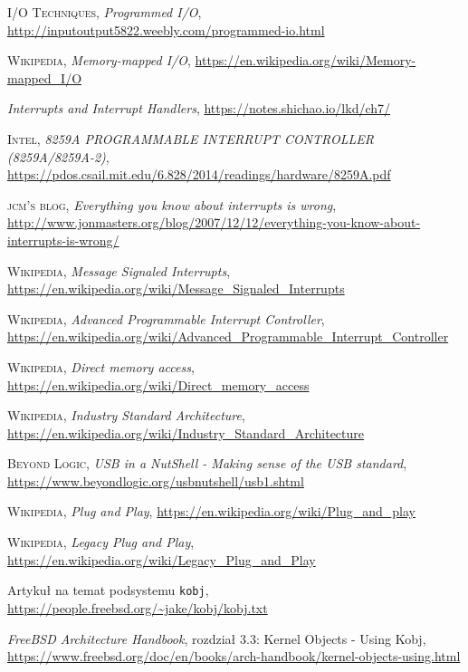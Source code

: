 \documentclass[shortabstract,inz]{iithesis}
\begin{document}
\begin{thebibliography}{1}
 \textsc{I/O Techniques}, \textit{Programmed I/O},
\url{http://inputoutput5822.weebly.com/programmed-io.html}

 \textsc{Wikipedia}, \textit{Memory-mapped I/O},
\url{https://en.wikipedia.org/wiki/Memory-mapped_I/O}

 \textit{Interrupts and Interrupt Handlers},
\url{https://notes.shichao.io/lkd/ch7/}

 \textsc{Intel}, \textit{8259A PROGRAMMABLE INTERRUPT CONTROLLER (8259A/8259A-2)},
\url{https://pdos.csail.mit.edu/6.828/2014/readings/hardware/8259A.pdf}

 \textsc{jcm's blog}, \textit{Everything you know about interrupts is wrong},
\url{http://www.jonmasters.org/blog/2007/12/12/everything-you-know-about-interrupts-is-wrong/}

 \textsc{Wikipedia}, \textit{Message Signaled Interrupts},
\url{https://en.wikipedia.org/wiki/Message_Signaled_Interrupts}

 \textsc{Wikipedia}, \textit{Advanced Programmable Interrupt Controller},
\url{https://en.wikipedia.org/wiki/Advanced_Programmable_Interrupt_Controller}

 \textsc{Wikipedia}, \textit{Direct memory access},
\url{https://en.wikipedia.org/wiki/Direct_memory_access}

 \textsc{Wikipedia}, \textit{Industry Standard Architecture},
\url{https://en.wikipedia.org/wiki/Industry_Standard_Architecture}

 \textsc{Beyond Logic}, \textit{USB in a NutShell - Making sense of the USB standard},
\url{https://www.beyondlogic.org/usbnutshell/usb1.shtml}

 \textsc{Wikipedia}, \textit{Plug and Play},
\url{https://en.wikipedia.org/wiki/Plug_and_play}

 \textsc{Wikipedia}, \textit{Legacy Plug and Play},
\url{https://en.wikipedia.org/wiki/Legacy_Plug_and_Play}

 Artykuł na temat podsystemu \texttt{kobj},
\url{https://people.freebsd.org/~jake/kobj/kobj.txt}

 \textit{FreeBSD Architecture Handbook},
rozdział 3.3: Kernel Objects - Using Kobj,
\url{https://www.freebsd.org/doc/en/books/arch-handbook/kernel-objects-using.html}


\end{thebibliography}
\end{document}
